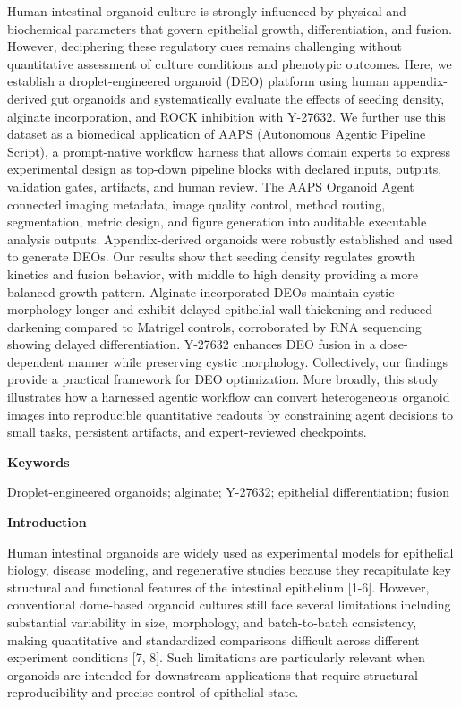 \documentclass[
]{article}
\providecommand{\DIFadd}[1]{{\begingroup\color{blue}#1\endgroup}}
\begin{document}
\DIFadd{Human intestinal organoid culture is strongly influenced by physical and biochemical parameters that govern epithelial growth, differentiation, and fusion. However, deciphering these regulatory cues remains challenging without quantitative assessment of culture conditions and phenotypic outcomes. Here, we establish a droplet-engineered organoid (DEO) platform using human appendix-derived gut organoids and systematically evaluate the effects of seeding density, alginate incorporation, and ROCK inhibition with Y-27632. We further use this dataset as a biomedical application of AAPS (Autonomous Agentic Pipeline Script), a prompt-native workflow harness that allows domain experts to express experimental design as top-down pipeline blocks with declared inputs, outputs, validation gates, artifacts, and human review. The AAPS Organoid Agent connected imaging metadata, image quality control, method routing, segmentation, metric design, and figure generation into auditable executable analysis outputs. Appendix-derived organoids were robustly established and used to generate DEOs. Our results show that seeding density regulates growth kinetics and fusion behavior, with middle to high density providing a more balanced growth pattern. Alginate-incorporated DEOs maintain cystic morphology longer and exhibit delayed epithelial wall thickening and reduced darkening compared to Matrigel controls, corroborated by RNA sequencing showing delayed differentiation. Y-27632 enhances DEO fusion in a dose-dependent manner while preserving cystic morphology. Collectively, our findings provide a practical framework for DEO optimization. More broadly, this study illustrates how a harnessed agentic workflow can convert heterogeneous organoid images into reproducible quantitative readouts by constraining agent decisions to small tasks, persistent artifacts, and expert-reviewed checkpoints.}

\textbf{Keywords}

Droplet-engineered organoids; alginate; Y-27632; epithelial differentiation; fusion

\textbf{Introduction}

Human intestinal organoids are widely used as experimental models for epithelial biology, disease modeling, and regenerative studies because they recapitulate key structural and functional features of the intestinal epithelium {[}1-6{]}. However, conventional dome-based organoid cultures still face several limitations including substantial variability in size, morphology, and batch-to-batch consistency, making quantitative and standardized comparisons difficult across different experiment conditions {[}7, 8{]}. Such limitations are particularly relevant when organoids are intended for downstream applications that require structural reproducibility and precise control of epithelial state.
\end{document}
